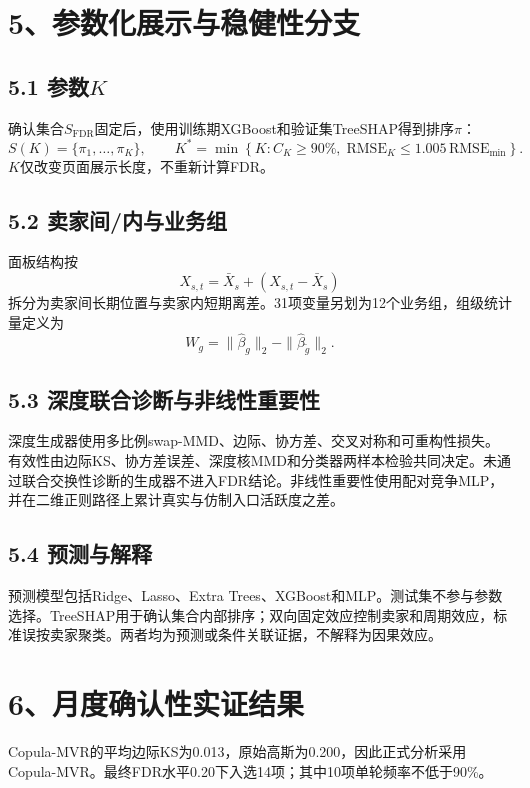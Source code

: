 \documentclass[UTF8,12pt,a4paper]{ctexart}
\begin{document}
\section*{5、参数化展示与稳健性分支}

\subsection*{5.1 参数$K$}

确认集合$S_{\mathrm{FDR}}$固定后，使用训练期XGBoost和验证集TreeSHAP得到排序$\pi$：
\[
S(K)=\{\pi_1,\ldots,\pi_K\},\qquad
K^*=\min\left\{K:C_K\ge90\%,\;
\mathrm{RMSE}_{K}\le1.005\,\mathrm{RMSE}_{\min}\right\}.
\]
$K$仅改变页面展示长度，不重新计算FDR。

\subsection*{5.2 卖家间/内与业务组}

面板结构按
\[
X_{s,t}=\bar X_s+(X_{s,t}-\bar X_s)
\]
拆分为卖家间长期位置与卖家内短期离差。31项变量另划为12个业务组，组级统计量定义为
\[
W_g=\|\widehat\beta_g\|_2-\|\widehat\beta_{\widetilde g}\|_2.
\]

\subsection*{5.3 深度联合诊断与非线性重要性}

深度生成器使用多比例swap-MMD、边际、协方差、交叉对称和可重构性损失。有效性由边际KS、协方差误差、深度核MMD和分类器两样本检验共同决定。未通过联合交换性诊断的生成器不进入FDR结论。非线性重要性使用配对竞争MLP，并在二维正则路径上累计真实与仿制入口活跃度之差。

\subsection*{5.4 预测与解释}

预测模型包括Ridge、Lasso、Extra Trees、XGBoost和MLP。测试集不参与参数选择。TreeSHAP用于确认集合内部排序；双向固定效应控制卖家和周期效应，标准误按卖家聚类。两者均为预测或条件关联证据，不解释为因果效应。

\newpage
\section*{6、月度确认性实证结果}

Copula-MVR的平均边际KS为0.013，原始高斯为0.200，因此正式分析采用Copula-MVR。最终FDR水平0.20下入选14项；其中10项单轮频率不低于90\%。
\end{document}
